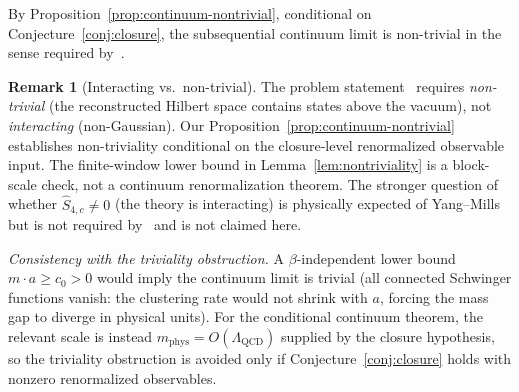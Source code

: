 \documentclass[11pt]{article}
\theoremstyle{definition}
\newtheorem{remark}[theorem]{Remark}
\newcommand{\Lam}{\Lambda_{\mathrm{QCD}}}
\begin{document}
\noindent
By Proposition~\ref{prop:continuum-nontrivial}, conditional on
Conjecture~\ref{conj:closure}, the subsequential continuum limit is
non-trivial in the sense required by~\cite{JaffeWitten}.

\begin{remark}[Interacting vs.\ non-trivial]%
\label{rem:interacting}
The problem statement~\cite{JaffeWitten} requires \emph{non-trivial}
(the reconstructed Hilbert space contains states above the vacuum),
not \emph{interacting} (non-Gaussian).  Our
Proposition~\ref{prop:continuum-nontrivial} establishes non-triviality
conditional on the closure-level renormalized observable input.  The
finite-window lower bound in Lemma~\ref{lem:nontriviality} is a
block-scale check, not a continuum renormalization theorem.  The
stronger question of whether $\hat S_{4,c}\ne 0$
(the theory is interacting) is physically expected of Yang--Mills
but is not required by~\cite{JaffeWitten} and is not claimed here.
\end{remark}

\emph{Consistency with the triviality obstruction.}
A $\beta$-independent
lower bound $m\cdot a\ge c_0>0$ would imply the continuum
limit is trivial (all connected Schwinger functions vanish:
the clustering rate would not shrink with $a$, forcing the
mass gap to diverge in physical units).
For the conditional continuum theorem, the relevant scale is instead
$m_{\mathrm{phys}}=O(\Lam)$ supplied by the closure hypothesis, so the
triviality obstruction is avoided only if Conjecture~\ref{conj:closure}
holds with nonzero renormalized observables.
\end{document}
